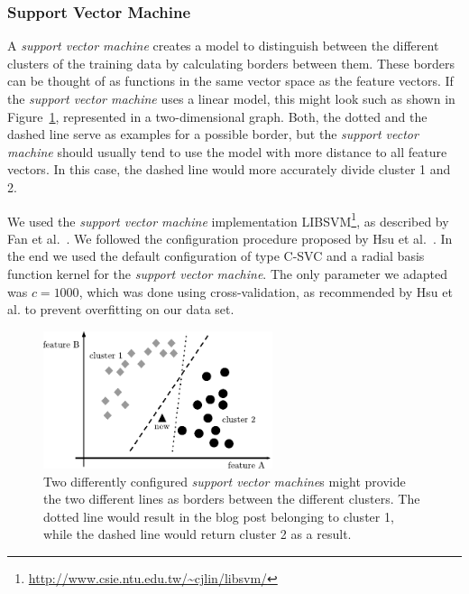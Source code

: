 \subsubsection{Support Vector Machine}
\label{sec:support_vector_machine}


A \textit{support vector machine} creates a model to distinguish between the different clusters of the training data by calculating borders between them.
These borders can be thought of as functions in the same vector space as the feature vectors.
If the \textit{support vector machine} uses a linear model, this might look such as shown in Figure~\ref{fig:svm}, represented in a two-dimensional graph.
Both, the dotted and the dashed line serve as examples for a possible border, but the \textit{support vector machine} should usually tend to use the model with more distance to all feature vectors.
In this case, the dashed line would more accurately divide cluster 1 and 2.


We used the \textit{support vector machine} implementation LIBSVM\footnote{\url{http://www.csie.ntu.edu.tw/~cjlin/libsvm/}}, as described by Fan et al.~\cite{fan2005working}.
We followed the configuration procedure proposed by Hsu et al.~\cite{hsu2003practical}.
In the end we used the default configuration of type C-SVC and a radial basis function kernel for the \textit{support vector machine}.
The only parameter we adapted was $c=1000$, which was done using cross-validation, as recommended by Hsu et al. to prevent overfitting on our data set.


\begin{figure}[ht!]
    \centering
    \includegraphics[width=0.6\textwidth]{images/svm.pdf}
    \caption{Two differently configured \textit{support vector machine}s might provide the two different lines as borders between the different clusters. The dotted line would result in the blog post belonging to cluster 1, while the dashed line would return cluster 2 as a result.}
    \label{fig:svm}
\end{figure}
